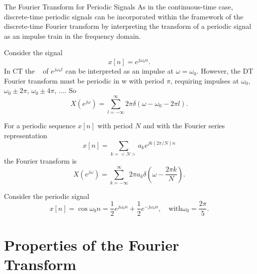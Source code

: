 \begin{frame}{The Fourier Transform for Periodic Signals}
As in the continuous-time case, discrete-time periodic signals can be incorporated within
the framework of the discrete-time Fourier transform by interpreting the transform of a
periodic signal as an impulse train in the frequency domain.

Consider the signal
\begin{equation*}
    x[n] = e^{j\omega_0 n}.
\end{equation*}
 In CT the \ft~ of $e^{j\omega_0 t}$ can be interpreted as an impulse at $\omega = \omega_0$. However, the DT Fourier transform must
be periodic in w with period $\pi$, requiring impulses at $\omega_0$,  $\omega_0 \pm 2\pi$, $\omega_0 \pm 4\pi$, $\dots$. So
\begin{equation*}
    X(e^{j\omega}) = \sum_{l=-\infty}^{\infty} 2\pi \delta (\omega - \omega_0 - 2\pi l).
\end{equation*}
    \begin{figure}
        \centering
        
    \end{figure}
\end{frame}

\begin{frame}
    {
    For a periodic sequence $x[n]$ with period $N$ and with the Fourier series representation
    \begin{equation*}
        x[n] = \sum_{k=<N>}a_k e^{jk(2\pi/N)n}
    \end{equation*}
    the Fourier transform is
    \begin{equation*}
        X(e^{j\omega}) = \sum_{k=-\infty}^{\infty} 2\pi a_k\delta \left(\omega - \frac{2\pi k}{N} \right).
    \end{equation*}
    }
\end{frame}


\begin{frame}
    \begin{example}
        Consider the periodic signal
        \begin{equation*}
            x[n] = \cos \omega_0 n = \frac{1}{2}e^{j\omega_0 n} +\frac{1}{2}e^{-j\omega_0 n}, \quad \text{with} \omega_0 = \frac{2\pi}{5}.
        \end{equation*}
    \end{example}
\end{frame}


\section{Properties of the Fourier Transform}

